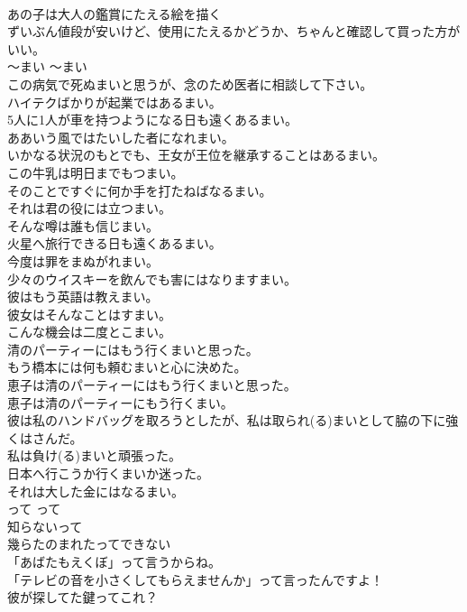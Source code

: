 \documentclass[8pt]{extreport}
\begin{document}
\begin{CJK}{UTF8}{min}
\\	あの子は大人の鑑賞にたえる絵を描く  
\\	ずいぶん値段が安いけど、使用にたえるかどうか、ちゃんと確認して買った方がいい。   
\\	〜まい	〜まい	
\\	この病気で死ぬまいと思うが、念のため医者に相談して下さい。  
\\	ハイテクばかりが起業ではあるまい。  
\\	5人に1人が車を持つようになる日も遠くあるまい。  
\\	ああいう風ではたいした者になれまい。  
\\	いかなる状況のもとでも、王女が王位を継承することはあるまい。  
\\	この牛乳は明日までもつまい。  
\\	そのことですぐに何か手を打たねばなるまい。  
\\	それは君の役には立つまい。  
\\	そんな噂は誰も信じまい。  
\\	火星へ旅行できる日も遠くあるまい。  
\\	今度は罪をまぬがれまい。  
\\	少々のウイスキーを飲んでも害にはなりますまい。  
\\	彼はもう英語は教えまい。   
\\	彼女はそんなことはすまい。   
\\	こんな機会は二度とこまい。  
\\	清のパーティーにはもう行くまいと思った。  
\\	もう橋本には何も頼むまいと心に決めた。  
\\	恵子は清のパーティーにはもう行くまいと思った。  
\\	恵子は清のパーティーにもう行くまい。  
\\	彼は私のハンドバッグを取ろうとしたが、私は取られ(る)まいとして脇の下に強くはさんだ。  
\\	私は負け(る)まいと頑張った。  
\\	日本へ行こうか行くまいか迷った。  
\\	それは大した金にはなるまい。  
\\	って	って	
\\	知らないって  
\\	幾らたのまれたってできない  
\\	「あばたもえくぼ」って言うからね。  
\\	「テレビの音を小さくしてもらえませんか」って言ったんですよ！  
\\	彼が探してた鍵ってこれ？  

\end{CJK}
\end{document}
